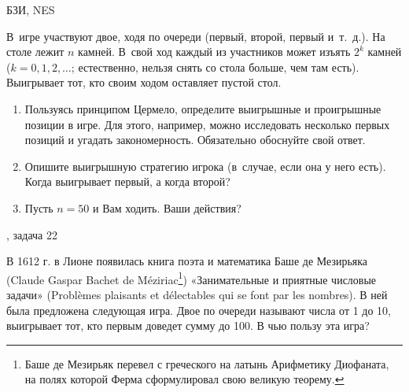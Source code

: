 \begin{problem}
\begin{source}
БЗИ, NES
\end{source} В~игре участвуют двое, ходя
по очереди (первый, второй, первый и~т.~д.). На столе лежит
$n$ камней. В~свой ход каждый из участников может изъять
$2^k$ камней ($k=0,1,2,\ldots$; естественно, нельзя снять
со стола больше, чем там есть). Выигрывает тот, кто своим
ходом оставляет пустой стол.

\begin{enumerate}

\item Пользуясь принципом Цермело, определите выигрышные и
проигрышные позиции в игре. Для этого, например, можно
исследовать несколько первых позиций и угадать
закономерность. Обязательно обоснуйте свой ответ.

\item Опишите выигрышную стратегию игрока (в~случае, если
она у него есть). Когда выигрывает первый, а когда второй?


\item Пусть $n=50$ и Вам ходить. Ваши действия?

\end{enumerate}







\begin{sol}

\end{sol}
\end{problem}




\begin{problem}
\begin{source}
\cite{bashe}, задача 22
\end{source}
В 1612 г. в Лионе появилась книга поэта и математика Баше де Мезирьяка (Claude Gaspar Bachet de M\'eziriac\footnote{Баше де Мезирьяк перевел с греческого на латынь Арифметику Диофаната, на полях которой Ферма сформулировал свою великую теорему.}) «Занимательные и приятные числовые задачи» (Probl\`emes plaisants et d\'electables qui se font par les nombres). В ней была предложена следующая игра. Двое по очереди называют числа от 1 до 10, выигрывает тот, кто первым доведет сумму до 100. В чью пользу эта игра?\par




\begin{sol}

\end{sol}
\end{problem}



